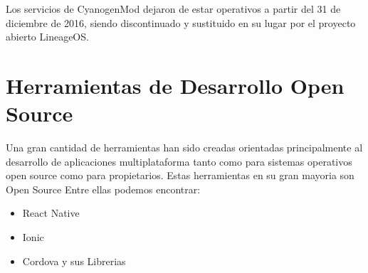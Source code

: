 Los servicios de CyanogenMod dejaron de estar operativos a partir del 31 de diciembre de 2016, siendo discontinuado y sustituido en su lugar por el proyecto abierto LineageOS.

\section{Herramientas de Desarrollo Open Source}
Una gran cantidad de herramientas han sido creadas orientadas principalmente al desarrollo de aplicaciones multiplataforma tanto como para sistemas operativos open source como para propietarios. Estas herramientas en su gran mayoria son Open Source 
Entre ellas podemos encontrar:
\begin{itemize}
	 \item React Native
 	 \item Ionic
 	 \item Cordova y sus Librerias
\end{itemize}